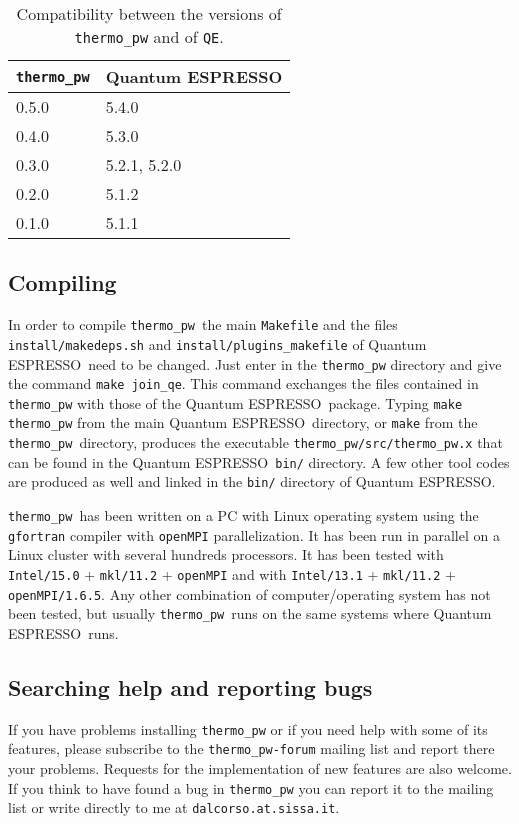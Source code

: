 \documentclass[12pt,a4paper]{article}
\def\qe{{\sc Quantum ESPRESSO}}
\def\thermo{\texttt{thermo\_pw}}
\begin{document}
\begin{center}
\begin{table}
\begin{tabular}{ll}
\hline
\hline
\texttt{thermo\_pw} & \qe  \\
\hline
0.5.0 & 5.4.0 \\
0.4.0 & 5.3.0 \\
0.3.0 & 5.2.1, 5.2.0 \\
0.2.0 & 5.1.2 \\
0.1.0 & 5.1.1 \\
\hline
\hline
\end{tabular}
\caption{Compatibility between the versions of 
\texttt{thermo\_pw} and of \texttt{QE}.}
\end{table}
\end{center}

\subsection{\color{web-blue}Compiling}

In order to compile \thermo\ the main \texttt{Makefile} and the files
\texttt{install/makedeps.sh} and \texttt{install/plugins\_makefile}
of \qe\ need to be changed. Just enter in the \texttt{thermo\_pw}
directory and give the command \texttt{make join\_qe}. This command exchanges
the files contained in \texttt{thermo\_pw} with those of the \qe\ package.
Typing \texttt{make thermo\_pw} from the main \qe\ directory, or \texttt{make} 
from the \texttt{thermo\_pw}\ directory, produces the executable
\texttt{thermo\_pw/src/thermo\_pw.x} that can be found in the 
\qe\ \texttt{bin/} directory. A few other tool codes are produced as well
and linked in the \texttt{bin/} directory of \qe.

\thermo\ has been written on a PC with Linux operating system using the
\texttt{gfortran} compiler with \texttt{openMPI} parallelization. It has
been run in parallel on a Linux cluster with several hundreds processors.
It has been tested with \texttt{Intel/15.0} + \texttt{mkl/11.2} +
\texttt{openMPI} and with \texttt{Intel/13.1} + \texttt{mkl/11.2} +
\texttt{openMPI/1.6.5}.
Any other combination of computer/operating system has not been tested, but 
usually \thermo\ runs on the same systems where \qe\ runs. 

\subsection{\color{web-blue}Searching help and reporting bugs}
If you have problems installing \texttt{thermo\_pw} or if you need help
with some of its features, please subscribe to the \texttt{thermo\_pw-forum}
mailing list and report there your problems. Requests for the implementation 
of new features are also welcome. If you think to have found a bug 
in \texttt{thermo\_pw} you can report it to the mailing list or 
write directly to me at \texttt{dalcorso.at.sissa.it}.
\end{document}
